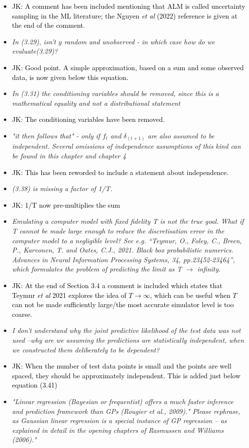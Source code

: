 \documentclass[12pt]{article}
\newcommand{\done}[2]{\item[#1]\textit{#2}}
\newcommand{\jack}[1]{\item{\textcolor{black}{JK: #1}}}
\begin{document}
\begin{itemize}
\jack{A comment has been included mentioning that ALM is called uncertainty sampling in the ML literature; the Nguyen \textit{et al} (2022) reference is given at the end of the comment.}

\done{P47}{In (3.29), isn't $y$ random and unobserved - in which case how do we evaluate(3.29)?}

\jack{Good point. A simple approximation, based on a sum and some observed data, is now given below this equation.}

\done{P48}{In (3.31) the conditioning variables should be removed, since this is a mathematical equality and not a distributional statement}

\jack{The conditioning variables have been removed.}

\done{P49}{"it then follows that" - only if $f_t$ and $\delta_{(t+1)}$ are also assumed to be independent.  Several omissions of independence assumptions of this kind can be found in this chapter and chapter 4}

\jack{This has been reworded to include a statement about independence.}

\done{P50}{(3.38) is missing a factor of 1/T.}

\jack{ 1/T now pre-multiplies the sum}

\done{P51}{Emulating a computer model with fixed fidelity T is not the true goal.  What if T cannot be made large enough to reduce the discretisation error in the computer model to a negligible level?  See e.g. ``Teymur, O., Foley, C., Breen, P., Karvonen, T. and Oates, C.J., 2021. Black box probabilistic numerics. Advances in Neural Information Processing Systems, 34, pp.23452-23464'', which formulates the problem of predicting the limit as T $\to$ infinity.}

\jack{At the end of Section 3.4 a comment is included which states that Teymur \textit{et al} 2021 explores the idea of $T \to \infty$, which can be useful when $T$ can not be made sufficiently large/the most accurate simulator level is too coarse.}

\done{P52}{I don’t understand why the joint predictive likelihood of the test data was not used –why are we assuming the predictions are statistically independent, when we constructed them deliberately to be dependent?}

\jack{When the number of test data points is small and the points are well spaced, they should be approximately independent. This is added just below equation (3.41)}

\done{P58}{"Linear regression (Bayesian or frequentist) offers a much faster inference and prediction framework than GPs (Rougier et al., 2009)."  Please rephrase, as Gaussian linear regression is a special instance of GP regression  -- as explained in detail in the opening chapters of Rasmussen and Williams (2006)."}


\end{itemize}
\end{document}
